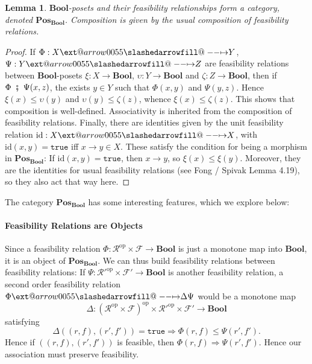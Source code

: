 \documentclass[12pt]{article}
\makeatletter
\theoremstyle{definition}
\theoremstyle{plain}
\newtheorem{lemma}{Lemma}[section]
\theoremstyle{plain}
\theoremstyle{plain}
\theoremstyle{plain}
\theoremstyle{remark}
\theoremstyle{remark}
\newcommand{\mc}[1]{\mathcal{#1}}
\newcommand{\id}{\text{id}}
\def\slashedarrowfill@#1#2#3#4#5{%
	$\m@th\thickmuskip0mu\medmuskip\thickmuskip\thinmuskip\thickmuskip
	\relax#5#1\mkern-7mu%
	\cleaders\hbox{$#5\mkern-2mu#2\mkern-2mu$}\hfill
	\mathclap{#3}\mathclap{#2}%
	\cleaders\hbox{$#5\mkern-2mu#2\mkern-2mu$}\hfill
	\mkern-7mu#4$%
}
\def\rightslashedarrowfill@{%
	\slashedarrowfill@\relbar\relbar\mapstochar\rightarrow}
\newcommand\xslashedrightarrow[2][]{%
	\ext@arrow 0055{\rightslashedarrowfill@}{#1}{#2}}
\makeatother
\begin{document}
\begin{lemma}
	$\mathbf{Bool}$-posets and their feasibility relationships form a category, denoted $\mathbf{Pos_{Bool}}$. Composition is given by the usual composition of feasibility relations. 
\end{lemma}

\begin{proof} 
	If $\Phi: X \xslashedrightarrow{} Y$, $\Psi: Y \xslashedrightarrow{} Z$ are feasibility relations between $\mathbf{Bool}$-posets $\xi: X \rightarrow \mathbf{Bool}$, $\upsilon: Y \rightarrow \mathbf{Bool}$ and $\zeta :Z \rightarrow \mathbf{Bool}$, then if $\Phi~\fatsemi~\Psi(x,z)$, the exists $y \in Y$ such that $\Phi(x,y)$ and $\Psi(y,z)$. Hence $\xi(x) \leq \upsilon(y)$ and $\upsilon(y) \leq \zeta(z)$, whence $\xi(x) \leq \zeta(z)$. This shows that composition is well-defined. Associativity is inherited from the composition of feasibility relations. Finally, there are identities given by the unit feasibility relation $\id: X \xslashedrightarrow{} X$, with $\id(x,y) = \mathtt{true}$ iff $x \rightarrow y \in X$. These satisfy the condition for being a morphism in $\mathbf{Pos_{Bool}}$: If $\id(x,y) = \mathtt{true}$, then $x \rightarrow y$, so $\xi (x) \leq \xi(y)$. Moreover, they are the identities for usual feasibility relations (see Fong / Spivak Lemma 4.19), so they also act that way here. 
\end{proof}

The category $\mathbf{Pos_{Bool}}$ has some interesting features, which we explore below:

\paragraph{Feasibility Relations are Objects} Since a feasibility relation $\Phi: \mc{R}^\text{op} \times \mc{F} \rightarrow \mathbf{Bool}$ is just a monotone map into $\mathbf{Bool}$, it is an object of $\mathbf{Pos_{Bool}}$. We can thus build feasibility relations between feasibility relations: If $\Psi: \mc{R'}^\text{op} \times \mc{F'} \rightarrow \mathbf{Bool}$ is another feasibility relation, a second order feasibility relation $\Phi \xslashedrightarrow{\Delta} \Psi$ would be a monotone map 
$$\Delta: (\mc{R}^\text{op} \times \mc{F})^\text{op} \times \mc{R'}^\text{op} \times \mc{F'} \rightarrow \mathbf{Bool}$$
satisfying
$$ \Delta((r,f),(r',f')) = \mathtt{true} \Rightarrow \Phi(r,f) \leq \Psi(r',f') .$$
Hence if $((r,f),(r',f'))$ is feasible, then $\Phi(r,f) \Rightarrow \Psi(r',f')$. Hence our association must preserve feasibility.
\end{document}
